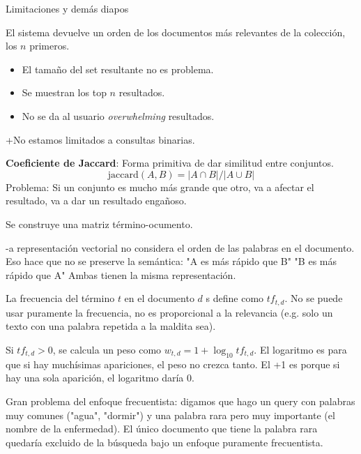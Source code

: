 \documentclass{fmbnotes}
\begin{document}
Limitaciones y demás diapos

\label{sec:modelos_de_recuperacion_ranqueada}

El sistema devuelve un orden de los documentos más relevantes de la colección, los \(n\) primeros.


\begin{itemize}
    \item El tamaño del set resultante no es problema.
    \item Se muestran los top \(n\) resultados.
    \item No se da al usuario \textit{overwhelming} resultados.
\end{itemize}

+No estamos limitados a consultas binarias.

\textbf{Coeficiente de Jaccard}: Forma primitiva de dar similitud entre conjuntos. 
\begin{equation*}
    \text{jaccard}(A, B) = |A \cap B|/|A\cup B|
\end{equation*}
Problema: Si un conjunto es mucho más grande que otro, va a afectar el resultado, va a dar un resultado engañoso.

\label{sec:bow_modelo_de_bolsa_de_palabras}

Se construye una matriz término-ocumento.

-a representación vectorial no considera el orden de las palabras en el documento.
Eso hace que no se preserve la semántica:
"A es más rápido que B"
"B es más rápido que A"
Ambas tienen la misma representación.

La frecuencia del término \(t\) en el documento \(d\) s define como \(tf_{t,d}\).
No se puede usar puramente la frecuencia, no es proporcional a la relevancia (e.g. solo un texto con una palabra repetida a la maldita sea).

Si \(tf_{t,d} > 0\), se calcula un peso como \(w_{t,d} = 1+\log_{10}tf_{t,d}\).
El logaritmo es para que si hay muchísimas apariciones, el peso no crezca tanto. El +1 es porque si hay una sola aparición, el logaritmo daría 0.

Gran problema del enfoque frecuentista: digamos que hago un query con palabras muy comunes ("agua", "dormir") y una palabra rara pero muy importante (el nombre de la enfermedad).
El único documento que tiene la palabra rara quedaría excluido de la búsqueda bajo un enfoque puramente frecuentista.
\end{document}
